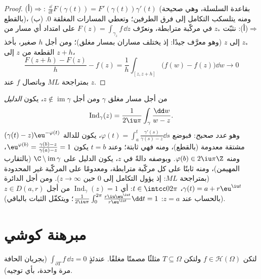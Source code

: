 \begin{proof}
(أ)$\Rightarrow$: $\frac{\dd}{\dd t}F(\gamma(t)) =
F'(\gamma(t))\gamma'(t)$ (بقاعدة السلسلة، وهي صحيحة بالقطع)،
ومنه يتلسكب التكامل إلى فرق الطرفين؛ وتعطي المسارات المغلقة
$0$. (ب)$\Rightarrow$(أ): نثبّت $z_*$ في مركّبة مترابطة، ونعرّف
$F(z) = \int_{\gamma_z}f\,\dd z$ على امتداد أي مسار من $z_*$ إلى $z$ (وهو معرَّف جيدًا:
إذ يختلف مساران بمسار مغلق)؛ ومن أجل $h$ صغير، بأخذ القطعة من
$z$ إلى $z + h$،
\[
\frac{F(z + h) - F(z)}{h} - f(z)
= \frac1h\int_{[z, z+h]}\bigl(f(w) - f(z)\bigr)\dd w
\longrightarrow 0
\]
بمتراجحة $ML$ وباتصال $f$ عند $z$.
\end{proof}

\begin{definition}\label{def:b3:holomorphic:index}
من أجل مسار مغلق $\gamma$ ومن أجل $z \notin
\operatorname{im}\gamma$، يكون
\emph{الدليل}
\[
\operatorname{Ind}_\gamma(z) = \frac1{2\iu\pi}
\int_\gamma\frac{\dd w}{w - z} .
\]
وهو \emph{عدد صحيح}: فبوضع $\varphi(t) =
\int_a^t\frac{\gamma'(s)}{\gamma(s) - z}\dd s$، يكون للدالة $(\gamma(t) - z)\eu^{-\varphi(t)}$ مشتقة
معدومة (بالقطع)، ومنه فهي ثابتة؛ وعند $t = b$ يكون $\eu^{\varphi(b)} =
\frac{\gamma(b) - z}{\gamma(a) - z} = 1$، ومنه
$\varphi(b) \in
2\iu\pi\Z$. وبوصفه دالةً في $z$، يكون الدليل  على $\C\setminus\operatorname{im}\gamma$
(بالتقارب المهيمن)، ومنه ثابتًا على كل مركّبة مترابطة، ومعدومًا
على المركّبة غير المحدودة (بمتراجحة $ML$: إذ يؤول التكامل إلى
$0$ حين $z \to
\infty$). ومن أجل الدائرة $\gamma(t) = a + r\eu^{\iu t}$، $t
\in \intcc0{2\pi}$: أي $\operatorname{Ind}_\gamma(z) = 1$ من
أجل $z
\in D(a,r)$ (بالحساب عند $z = a$: $\frac1{2\iu\pi}
\int_0^{2\pi}\frac{r\iu\eu^{\iu t}}{r\eu^{\iu t}}\dd t = 1$؛ ويتكفّل الثبات
بالباقي).
\end{definition}

\section{مبرهنة كوشي}

\begin{theorem}[غورسا]\label{thm:b3:holomorphic:goursat}
لتكن $f \in \mathcal H(\Omega)$ ولتكن $T \subseteq \Omega$ مثلثًا مصمتًا مغلقًا. عندئذٍ $\int_{\partial T}f\,\dd z = 0$
(بجريان الحافة مرة واحدة، بأي توجيه).
\end{theorem}

